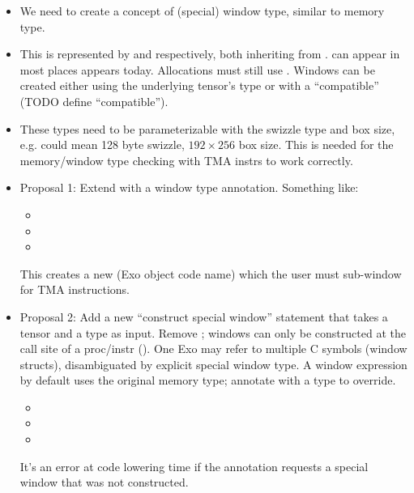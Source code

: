 \begin{itemize}
  \item We need to create a concept of (special) window type, similar to memory type.
  \item This is represented by  and  respectively, both inheriting from .
     can appear in most places  appears today.
    Allocations must still use .
    Windows can be created either using the underlying tensor's  type or with a ``compatible''  (TODO define ``compatible'').
  \item These types need to be parameterizable with the swizzle type and box size, e.g.  could mean 128 byte swizzle, $192 \times 256$ box size.
    This is needed for the memory/window type checking with TMA instrs to work correctly.
  \item Proposal 1: Extend  with a window type annotation. Something like:
  \begin{itemize}
    \item {}
    \item {}
    \item {}
  \end{itemize}
  This creates a new  (Exo object code name) which the user must sub-window for TMA instructions.
  \item Proposal 2: Add a new ``construct special window'' statement that takes a tensor and a  type as input.
  Remove ; windows can only be constructed at the call site of a proc/instr ().
  One Exo  may refer to multiple C symbols (window structs), disambiguated by explicit special window type.
  A window expression by default uses the original memory type; annotate with a  type to override.
  \begin{itemize}
    \item {}
    \item {}
    \item {}
  \end{itemize}
  It's an error at code lowering time if the annotation requests a special window that was not constructed.
\end{itemize}

